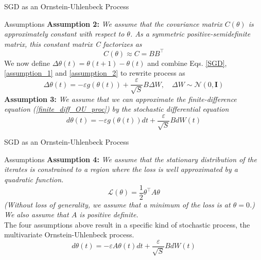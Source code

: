 \documentclass{beamer}
\begin{document}
\begin{frame}{SGD as an Ornstein-Uhlenbeck Process}
    \begin{block}{Assumptions}
        \textbf{Assumption 2:} \textit{We assume that the covariance matrix $C(\theta)$ is approximately constant with respect to $\theta$. As a symmetric positive-semidefinite matrix, this constant matrix C factorizes as}
        \begin{equation}\label{assumption_2}
            C(\theta) \approx C = BB^{\top}
        \end{equation}
        We now define $\Delta\theta(t) = \theta(t+1) - \theta(t)$ and combine Eqs. \ref{SGD}, \ref{assumption_1} and \ref{assumption_2} to rewrite process as
        \begin{equation}\label{finite_diff_OU_proc}
            \Delta\theta(t) = -\varepsilon g(\theta(t)) + \dfrac{\varepsilon}{\sqrt{S}}B\Delta W, \quad \Delta W \sim \mathcal{N}(0, \boldsymbol{I})
        \end{equation}
        \textbf{Assumption 3:} \textit{We assume that we can approximate the finite-difference equation (\ref{finite_diff_OU_proc}) by the stochastic differential equation}
        \begin{equation}\label{assumption_3}
            d\theta(t) = -\varepsilon g(\theta(t))dt + \dfrac{\varepsilon}{\sqrt{S}}B dW(t)
        \end{equation}
    \end{block}
\end{frame}

\begin{frame}{SGD as an Ornstein-Uhlenbeck Process}
    \begin{block}{Assumptions}
        \textbf{Assumption 4:} \textit{We assume that the stationary distribution of the iterates is constrained to a region where the loss is well approximated by a quadratic function.}
        \begin{equation}\label{assumption_4}
            \mathcal{L}(\theta) = \dfrac{1}{2}\theta^{\top}A\theta
        \end{equation}
        \textit{(Without loss of generality, we assume that a minimum of the loss is at $\theta = 0$.) We also assume that $A$ is positive definite.} \\
        The four assumptions above result in a specific kind of stochastic process, the multivariate Ornstein-Uhlenbeck process. 
        \begin{equation}\label{SGD_as_OU_proc}
            d\theta(t) = -\varepsilon A\theta(t)dt + \dfrac{\varepsilon}{\sqrt{S}}B dW(t)
        \end{equation}
    \end{block}
\end{frame}
\end{document}
